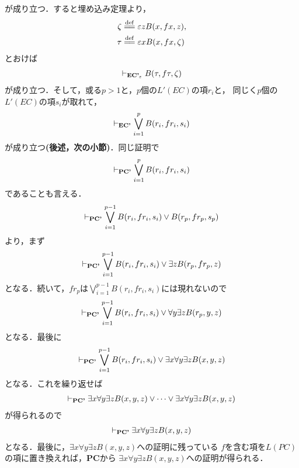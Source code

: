 	が成り立つ．すると埋め込み定理より，
	\begin{align}
		\zeta &\defeq \varepsilon z B(x,fx,z), \\
		\tau &\defeq \varepsilon x B(x,fx,\zeta)
	\end{align}
	とおけば
	\begin{align}
		\vdash_{{\scriptsize \mbox{{\bf EC'}${}_{\varepsilon}$}}} B(\tau,f\tau,\zeta)
	\end{align}
	が成り立つ．そして，或る$p>1$と，$p$個の$L'(EC)$の項$r_{i}$と，
	同じく$p$個の$L'(EC)$の項$s_{i}$が取れて，
	\begin{align}
		\vdash_{{\scriptsize \mbox{{\bf EC'}}}} \bigvee_{i=1}^{p} B(r_{i},fr_{i},s_{i})
	\end{align}
	が成り立つ{\bf (後述，次の小節)}．同じ証明で
	\begin{align}
		\vdash_{{\scriptsize \mbox{{\bf PC'}}}} \bigvee_{i=1}^{p} B(r_{i},fr_{i},s_{i})
	\end{align}
	であることも言える．
	\begin{align}
		\vdash_{{\scriptsize \mbox{{\bf PC'}}}} \bigvee_{i=1}^{p-1} B(r_{i},fr_{i},s_{i})
		\vee B(r_{p},fr_{p},s_{p})
	\end{align}
	より，まず
	\begin{align}
		\vdash_{{\scriptsize \mbox{{\bf PC'}}}} \bigvee_{i=1}^{p-1} B(r_{i},fr_{i},s_{i})
		\vee \exists z B(r_{p},fr_{p},z)
	\end{align}
	となる．続いて，$fr_{p}$は$\bigvee_{i=1}^{p-1} B(r_{i},fr_{i},s_{i})$には現れないので
	\begin{align}
		\vdash_{{\scriptsize \mbox{{\bf PC'}}}} \bigvee_{i=1}^{p-1} B(r_{i},fr_{i},s_{i})
		\vee \forall y \exists z B(r_{p},y,z)
	\end{align}
	となる．最後に
	\begin{align}
		\vdash_{{\scriptsize \mbox{{\bf PC'}}}} \bigvee_{i=1}^{p-1} B(r_{i},fr_{i},s_{i})
		\vee \exists x \forall y \exists z B(x,y,z)
	\end{align}
	となる．これを繰り返せば
	\begin{align}
		\vdash_{{\scriptsize \mbox{{\bf PC'}}}} \exists x \forall y \exists z B(x,y,z)
		\vee \cdots \vee \exists x \forall y \exists z B(x,y,z)
	\end{align}
	が得られるので
	\begin{align}
		\vdash_{{\scriptsize \mbox{{\bf PC'}}}} \exists x \forall y \exists z B(x,y,z)
	\end{align}
	となる．最後に，$\exists x \forall y \exists z B(x,y,z)$への証明に残っている
	$f$を含む項を$L(PC)$の項に置き換えれば，{\bf PC}から
	$\exists x \forall y \exists z B(x,y,z)$への証明が得られる．
	
